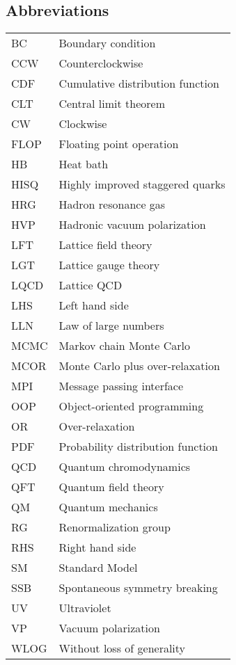 \documentclass[12pt]{book}
\theoremstyle{definition}
\newenvironment{frontstuff}
  {\centering\chapter*{}}
  {\clearpage}
\begin{document}
\begin{frontstuff}
\section*{Abbreviations}
\begin{tabular}{ll}
BC      &       Boundary condition \\
CCW     &       Counterclockwise\\
CDF     &       Cumulative distribution function \\
CLT     &       Central limit theorem\\
CW      &       Clockwise\\
FLOP    &       Floating point operation\\
HB      &       Heat bath\\
HISQ    &       Highly improved staggered quarks\\
HRG     &       Hadron resonance gas\\
HVP     &       Hadronic vacuum polarization\\
LFT     &       Lattice field theory\\
LGT     &       Lattice gauge theory\\
LQCD    &       Lattice QCD\\
LHS     &       Left hand side\\
LLN     &       Law of large numbers\\
MCMC    &       Markov chain Monte Carlo\\
MCOR    &       Monte Carlo plus over-relaxation \\
MPI     &       Message passing interface \\
OOP     &       Object-oriented programming \\
OR      &       Over-relaxation \\
PDF     &       Probability distribution function \\
QCD     &       Quantum chromodynamics \\
QFT     &       Quantum field theory \\
QM      &       Quantum mechanics \\
RG      &       Renormalization group \\
RHS     &       Right hand side \\
SM      &       Standard Model \\
SSB     &       Spontaneous symmetry breaking\\
UV      &       Ultraviolet \\
VP      &       Vacuum polarization \\
WLOG    &       Without loss of generality
\end{tabular}
\clearpage



\end{frontstuff}
\end{document}
